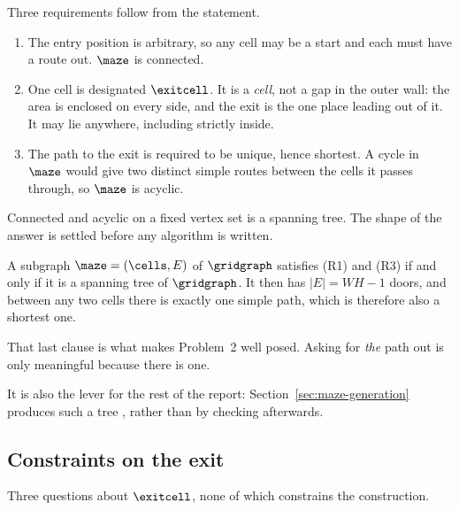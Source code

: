 Three requirements follow from the statement.

\begin{enumerate}[label=(R\arabic*),leftmargin=*,itemsep=4pt]
  \item {} The entry position is arbitrary,
        so any cell may be a start and each must have a route out. $\maze$ is
        connected.
  \item {} One cell is designated
        $\exitcell$. It is a \emph{cell}, not a gap in the outer wall: the area
        is enclosed on every side, and the exit is the one place leading out of
        it. It may lie anywhere, including strictly inside.
  \item {} The path to the exit is required
        to be unique, hence shortest. A cycle in $\maze$ would give two distinct
        simple routes between the cells it passes through, so $\maze$ is
        acyclic.
\end{enumerate}

Connected and acyclic on a fixed vertex set is a spanning tree. The shape of the
answer is settled before any algorithm is written.

\begin{proposition}
\label{prop:spanning-tree}
A subgraph $\maze=(\cells,E)$ of $\gridgraph$ satisfies \textup{(R1)} and
\textup{(R3)} if and only if it is a spanning tree of $\gridgraph$. It then has
$|E|=WH-1$ doors, and between any two cells there is exactly one simple path,
which is therefore also a shortest one.
\end{proposition}

That last clause is what makes Problem~2 well posed. Asking for \emph{the} path
out is only meaningful because there is one.

It is also the lever for the rest of the report:
Section~\ref{sec:maze-generation} produces such a tree , rather than by checking afterwards.

\subsection{Constraints on the exit}
\label{sec:exit-constraints}

Three questions about $\exitcell$, none of which constrains the construction.

